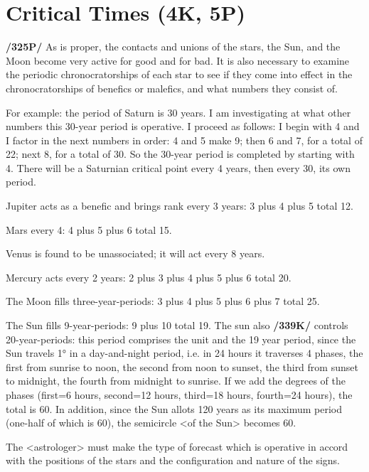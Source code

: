 \section{Critical Times (4K, 5P)}

\textbf{/325P/} As is proper, the contacts and unions of the stars, the Sun, and the Moon become very active for good and for bad. It is also necessary to examine the periodic chronocratorships of each star to see if they come into effect in the chronocratorships of benefics or malefics, and what numbers they consist of. 

For example: the period of Saturn is 30 years. I am investigating at what other numbers this 30-year period is operative. I proceed as follows: I begin with 4 and I factor in the next numbers in order: 4 and 5 make 9; then 6 and 7, for a total of 22; next 8, for a total of 30. So the 30-year period is completed by starting with 4. There will be a Saturnian critical point every 4 years, then every 30, its own period.

Jupiter acts as a benefic and brings rank every 3 years: 3 plus 4 plus 5 total 12.

Mars every 4: 4 plus 5 plus 6 total 15.

Venus is found to be unassociated; it will act every 8 years.

Mercury acts every 2 years: 2 plus 3 plus 4 plus 5 plus 6 total 20.

The Moon fills three-year-periods: 3 plus 4 plus 5 plus 6 plus 7 total 25.

The Sun fills 9-year-periods: 9 plus 10 total 19. The sun also \textbf{/339K/} controls 20-year-periods: this period comprises the unit and the 19 year period, since the Sun travels 1° in a day-and-night period, i.e. in 24 hours it traverses 4 phases, the first from sunrise to noon, the second from noon to sunset, the third from sunset to midnight, the fourth from midnight to sunrise. If we add the degrees of the phases (first=6 hours, second=12 hours, third=18 hours, fourth=24 hours), the total is 60. In addition, since the Sun allots 120 years as its maximum period (one-half of which is 60), the semicircle <of the Sun> becomes 60. 

The <astrologer> must make the type of forecast which is operative in accord with the positions of the stars and the configuration and nature of the signs.

\newpage